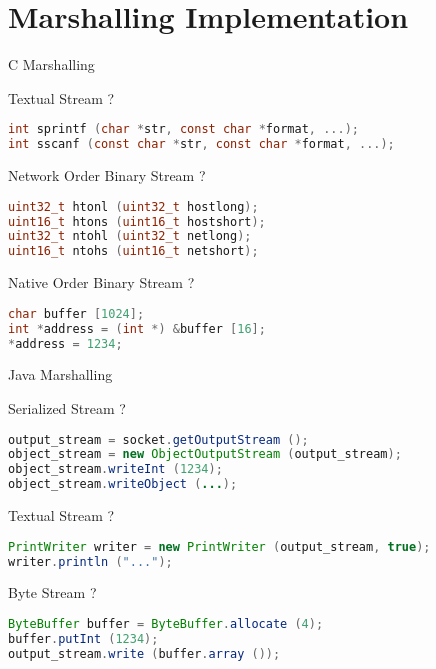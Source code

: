 \section{Marshalling Implementation}


\begin{frame}[fragile]{C Marshalling}
    \begin{block}{Textual Stream ?}
\begin{lstlisting}[language=c,style=mini]
int sprintf (char *str, const char *format, ...);
int sscanf (const char *str, const char *format, ...);
\end{lstlisting}
    \end{block}
    \begin{block}{Network Order Binary Stream ?}
\begin{lstlisting}[language=c,style=mini]
uint32_t htonl (uint32_t hostlong);
uint16_t htons (uint16_t hostshort);
uint32_t ntohl (uint32_t netlong);
uint16_t ntohs (uint16_t netshort);
\end{lstlisting}
    \end{block}
    \begin{block}{Native Order Binary Stream ?}
\begin{lstlisting}[language=c,style=mini]
char buffer [1024];
int *address = (int *) &buffer [16];
*address = 1234;
\end{lstlisting}
    \end{block}
\end{frame}


\begin{frame}[fragile]{Java Marshalling}
    \begin{block}{Serialized Stream ?}
\begin{lstlisting}[language=java,style=mini]
output_stream = socket.getOutputStream ();
object_stream = new ObjectOutputStream (output_stream);
object_stream.writeInt (1234);
object_stream.writeObject (...);
\end{lstlisting}
    \end{block}
    \begin{block}{Textual Stream ?}
\begin{lstlisting}[language=java,style=mini]
PrintWriter writer = new PrintWriter (output_stream, true);
writer.println ("...");
\end{lstlisting}
    \end{block}
    \begin{block}{Byte Stream ?}
\begin{lstlisting}[language=java,style=mini]
ByteBuffer buffer = ByteBuffer.allocate (4);
buffer.putInt (1234);
output_stream.write (buffer.array ());
\end{lstlisting}
    \end{block}
\end{frame}


